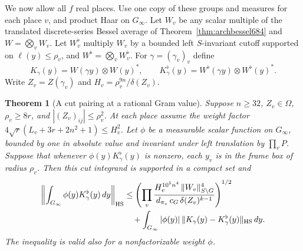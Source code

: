 \documentclass[a4paper,11pt]{article}
\newtheorem{theorem}[proposition]{Theorem}
\theoremstyle{definition}
\theoremstyle{remark}
\numberwithin{equation}{section}
\begin{document}
We now allow all \(f\) real places. Use one copy of these groups
and measures for each place \(v\), and product Haar on
\(G_\infty\). Let \(W_v\) be any scalar multiple of the
translated discrete-series Bessel average of
Theorem~\ref{thm:archbessel684} and \(W=\bigotimes_v W_v\).
Let \(W_v^\flat\) multiply \(W_v\) by a bounded left
\(S\)-invariant cutoff supported on \(\ell(y)\le\rho_v\), and
\(W^\flat=\bigotimes_v W_v^\flat\). For
\(\gamma=(\gamma_v)_v\) define
\[
 K_\gamma(y)=W(\gamma y)\otimes W(y)^*,\qquad
 K_\gamma^\flat(y)=W^\flat(\gamma y)\otimes W^\flat(y)^* .
\]
Write \(Z_v=Z(\gamma_v)\) and \(H_v=\rho_v^{9n}/\delta(Z_v)\).

\begin{theorem}[A cut pairing at a rational Gram value]
\leavevmode\label{thm:realpair685}
Suppose \(n\ge32\), \(Z_v\in\Omega\), \(\rho_v\ge8r\), and
\(|(Z_v)_{ij}|\le\rho_v^2\). At each place assume the weight
factor \(4\sqrt r(L_v+3r+2n^2+1)\le H_v^2\). Let \(\phi\)
be a measurable scalar function on \(G_\infty\), bounded by
one in absolute value and invariant under left translation by
\(\prod_v P\). Suppose that whenever \(\phi(y)K^\flat_\gamma(y)\)
is nonzero, each \(y_v\) is in the frame box of radius \(\rho_v\).
Then this cut integrand is supported in a compact set and
\[
 \begin{split}
 \left\|\int_{G_\infty}\phi(y)K^\flat_\gamma(y)\,dy\right\|_{\rm HS}
 &\le
 \left(\prod_v
  \frac{H_v^{10^5 n^4}\,\|W_v\|_{S\backslash G}^{4}}
       {d_{\pi_v}\,c_G\,\delta(Z_v)^{k-1}}\right)^{1/2}\\
 &\quad+\int_{G_\infty}|\phi(y)|\,
             \|K_\gamma(y)-K_\gamma^\flat(y)\|_{\rm HS}\,dy .
 \end{split}
\]
The inequality is valid also for a nonfactorizable weight \(\phi\).
\end{theorem}
\end{document}
